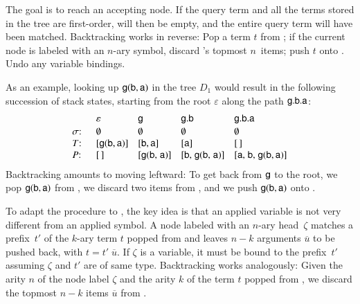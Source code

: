 %
The goal is to reach an accepting node. If the query term and all the terms
stored in the tree are first-order, \TermStack{} will then be empty, and the
entire query term will have been matched.
%
Backtracking works in reverse: Pop a term $t$ from \BTStack; if the current
node is labeled with an $n$-ary symbol, discard \TermStack{}'s topmost
$n$~items; push $t$ onto \TermStack. Undo any variable bindings.

As an example, looking up $\mathsf{g}(\mathsf{b}, \mathsf{a})$ in the tree $D_1$
would result in the following succession of stack states, starting from the
root $\varepsilon$ along the path $\mathsf{g}.\mathsf{b}.\mathsf{a}$:
%
\[\begin{array}{@{}l@{\kern1.5em}l@{\kern1em}l@{\kern1em}l@{\kern1em}l@{}}
& \varepsilon & \cst{g} & \cst{g}.\cst{b} & \cst{g}.\cst{b}.\cst{a} \\[.5\jot]
\sigma{:} & \emptyset & \emptyset & \emptyset & \emptyset \\
\TermStack{:} & [\cst{g}(\cst{b}, \cst{a})] & [\cst{b}, \cst{a}] & [\cst{a}] & [\,] \\
\BTStack{:} & [\,] & [\cst{g}(\cst{b}{,}\; \cst{a})] & [\cst{b}{,}\; \cst{g}(\cst{b}{,}\; \cst{a})] & [\cst{a}{,}\; \cst{b}{,}\; \cst{g}(\cst{b}, \cst{a})]
\end{array}\]
%
Backtracking amounts to moving leftward:
To get back from $\mathsf{g}$ to the root, we pop $\mathsf{g}(\mathsf{b}, \mathsf{a})$
from \BTStack, we discard two items from \TermStack{}, and we push
$\mathsf{g}(\mathsf{b}, \mathsf{a})$ onto \TermStack{}.

To adapt the procedure to \lfhol{}, the key idea is that an applied variable
is not very different from an applied symbol. A node labeled with an $n$-ary
head~$\zeta$ matches a prefix~$t'$ of the $k$-ary term $t$
popped from \TermStack{} and leaves $n - k$ arguments $\overline{u}$ to be
pushed back, with $t = t' \; \overline{u}.$ If $\zeta$ is a variable, it must
be bound to the prefix~$t'$ assuming $\zeta$ and $t'$ are of same type.
%
Backtracking works analogously: Given the arity $n$ of the node label $\zeta$
and the arity $k$ of the term $t$ popped from \BTStack{}, we discard the
topmost $n - k$ items $\overline{u}$ from \BTStack.

